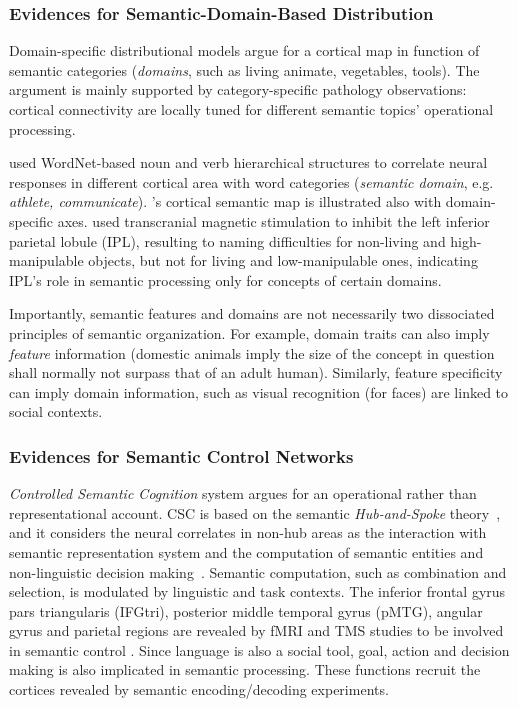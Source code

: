 \subsubsection{Evidences for Semantic-Domain-Based Distribution}

Domain-specific distributional models \parencite{damasioNeuralBasisLexical1996, damasioNeuralSystemsWord2004, mahonWhatDrivesOrganization2011} argue for a cortical map in function of semantic categories (\emph{domains}, such as living animate, vegetables, tools). The argument is mainly supported by category-specific pathology observations: cortical connectivity are locally tuned for different semantic topics' operational processing. 

\textcite{huthContinuousSemanticSpace2012} used WordNet-based noun and verb hierarchical structures to correlate neural responses in different cortical area with word categories (\emph{semantic domain}, e.g. \emph{athlete, communicate}). \textcite{huthNaturalSpeechReveals2016}'s cortical semantic map is illustrated also with domain-specific axes. \textcite{pobricCategorySpecificCategoryGeneralSemantic2010} used transcranial magnetic stimulation to inhibit the left inferior parietal lobule (IPL), resulting to naming difficulties for non-living and high-manipulable objects, but not for living and low-manipulable ones, indicating IPL's role in semantic processing only for concepts of certain domains.

Importantly, semantic features and domains are not necessarily two dissociated principles of semantic organization. For example, domain traits can also imply \emph{feature} information (domestic animals imply the size of the concept in question shall normally not surpass that of an adult human). Similarly, feature specificity can imply domain information, such as visual recognition (for faces) are linked to social contexts.

\subsubsection{Evidences for Semantic Control Networks}
\emph{Controlled Semantic Cognition} \parencite{ralphNeuralComputationalBases2017} system argues for an operational rather than representational account. CSC is based on the semantic \emph{Hub-and-Spoke} theory~\parencite{pattersonWhereYouKnow2007}, and it considers the neural correlates in non-hub areas as the interaction with semantic representation system and the computation of semantic entities and non-linguistic decision making~\parencite{fusterUpperProcessingStages2004}. Semantic computation, such as combination and selection, is modulated by linguistic and task contexts. The inferior frontal gyrus pars triangularis (IFGtri), posterior middle temporal gyrus (pMTG), angular gyrus and parietal regions are revealed by fMRI and TMS studies to be involved in semantic control \parencite{noonanGoingInferiorPrefrontal2013}. Since language is also a social tool, goal, action and decision making is also implicated in semantic processing. These functions recruit the cortices revealed by semantic encoding/decoding experiments.

